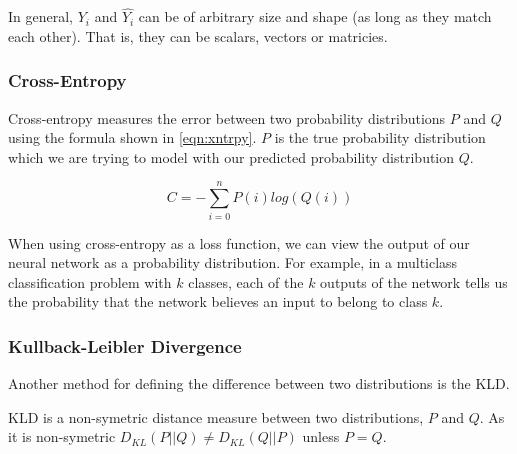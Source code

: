 In general, $Y_i$ and $\hat{Y_i}$ can be of arbitrary size and shape (as long as they match each other). That is, they can be scalars, vectors or matricies.

\subsubsection{Cross-Entropy}
Cross-entropy measures the error between two probability distributions $P$ and $Q$ using the formula shown in \autoref{eqn:xntrpy}. $P$ is the true probability distribution which we are trying to model with our predicted probability distribution $Q$.

\begin{equation} \label{eqn:xntrpy}
C = -\sum_{i=0}^{n}P(i) log(Q(i))
\end{equation}

When using cross-entropy as a loss function, we can view the output of our neural network as a probability distribution. For example, in a multiclass classification problem with $k$ classes, each of the $k$ outputs of the network tells us the probability that the network believes an input to belong to class $k$.


%
%
%
%


\subsubsection{Kullback-Leibler Divergence}

Another method for defining the difference between two distributions is the \ac{KLD}.

\ac{KLD} is a non-symetric distance measure between two distributions, $P$ and $Q$. As it is non-symetric $D_{KL}(P||Q) \neq D_{KL}(Q||P)$ unless $P = Q$.

